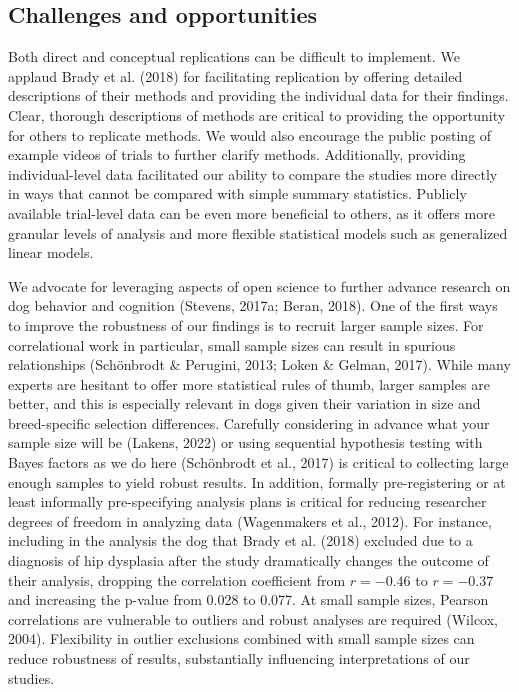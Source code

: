 \documentclass[
  pub,floatsintext]{apa6}
\begin{document}
\hypertarget{challenges-and-opportunities}{%
\subsection{Challenges and opportunities}\label{challenges-and-opportunities}}

Both direct and conceptual replications can be difficult to implement. We applaud Brady et al. (2018) for facilitating replication by offering detailed descriptions of their methods and providing the individual data for their findings. Clear, thorough descriptions of methods are critical to providing the opportunity for others to replicate methods. We would also encourage the public posting of example videos of trials to further clarify methods. Additionally, providing individual-level data facilitated our ability to compare the studies more directly in ways that cannot be compared with simple summary statistics. Publicly available trial-level data can be even more beneficial to others, as it offers more granular levels of analysis and more flexible statistical models such as generalized linear models.

We advocate for leveraging aspects of open science to further advance research on dog behavior and cognition (Stevens, 2017a; Beran, 2018). One of the first ways to improve the robustness of our findings is to recruit larger sample sizes. For correlational work in particular, small sample sizes can result in spurious relationships (Schönbrodt \& Perugini, 2013; Loken \& Gelman, 2017). While many experts are hesitant to offer more statistical rules of thumb, larger samples are better, and this is especially relevant in dogs given their variation in size and breed-specific selection differences. Carefully considering in advance what your sample size will be (Lakens, 2022) or using sequential hypothesis testing with Bayes factors as we do here (Schönbrodt et al., 2017) is critical to collecting large enough samples to yield robust results. In addition, formally pre-registering or at least informally pre-specifying analysis plans is critical for reducing researcher degrees of freedom in analyzing data (Wagenmakers et al., 2012). For instance, including in the analysis the dog that Brady et al. (2018) excluded due to a diagnosis of hip dysplasia after the study dramatically changes the outcome of their analysis, dropping the correlation coefficient from \(r = -0.46\) to \(r = -0.37\) and increasing the p-value from 0.028 to 0.077. At small sample sizes, Pearson correlations are vulnerable to outliers and robust analyses are required (Wilcox, 2004). Flexibility in outlier exclusions combined with small sample sizes can reduce robustness of results, substantially influencing interpretations of our studies.
\end{document}
